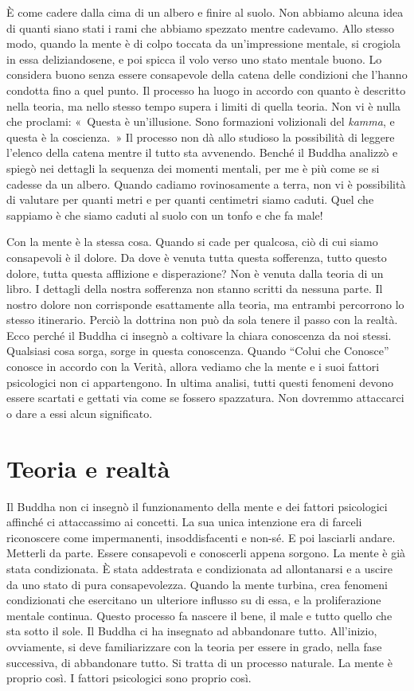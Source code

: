 È come cadere dalla cima di un albero e finire al suolo. Non abbiamo
alcuna idea di quanti siano stati i rami che abbiamo spezzato mentre
cadevamo. Allo stesso modo, quando la mente è di colpo toccata da
un'impressione mentale, si crogiola in essa deliziandosene, e poi spicca
il volo verso uno stato mentale buono. Lo considera buono senza essere
consapevole della catena delle condizioni che l'hanno condotta fino a
quel punto. Il processo ha luogo in accordo con quanto è descritto nella
teoria, ma nello stesso tempo supera i limiti di quella teoria. Non vi è
nulla che proclami: «~Questa è un'illusione. Sono formazioni volizionali
del \emph{kamma}, e questa è la coscienza.~» Il processo non dà allo
studioso la possibilità di leggere l'elenco della catena mentre il tutto
sta avvenendo. Benché il Buddha analizzò e spiegò nei dettagli la
sequenza dei momenti mentali, per me è più come se si cadesse da un
albero. Quando cadiamo rovinosamente a terra, non vi è possibilità di
valutare per quanti metri e per quanti centimetri siamo caduti. Quel che
sappiamo è che siamo caduti al suolo con un tonfo e che fa male!

Con la mente è la stessa cosa. Quando si cade per qualcosa, ciò di cui
siamo consapevoli è il dolore. Da dove è venuta tutta questa sofferenza,
tutto questo dolore, tutta questa afflizione e disperazione? Non è
venuta dalla teoria di un libro. I dettagli della nostra sofferenza non
stanno scritti da nessuna parte. Il nostro dolore non corrisponde
esattamente alla teoria, ma entrambi percorrono lo stesso itinerario.
Perciò la dottrina non può da sola tenere il passo con la realtà. Ecco
perché il Buddha ci insegnò a coltivare la chiara conoscenza da noi
stessi. Qualsiasi cosa sorga, sorge in questa conoscenza. Quando ``Colui
che Conosce'' conosce in accordo con la Verità, allora vediamo che la
mente e i suoi fattori psicologici non ci appartengono. In ultima
analisi, tutti questi fenomeni devono essere scartati e gettati via come
se fossero spazzatura. Non dovremmo attaccarci o dare a essi alcun
significato.

\section{Teoria e realtà}

Il Buddha non ci insegnò il funzionamento della mente e dei fattori
psicologici affinché ci attaccassimo ai concetti. La sua unica
intenzione era di farceli riconoscere come impermanenti, insoddisfacenti
e non-sé. E poi lasciarli andare. Metterli da parte. Essere consapevoli
e conoscerli appena sorgono. La mente è già stata condizionata. È stata
addestrata e condizionata ad allontanarsi e a uscire da uno stato di
pura consapevolezza. Quando la mente turbina, crea fenomeni condizionati
che esercitano un ulteriore influsso su di essa, e la proliferazione
mentale continua. Questo processo fa nascere il bene, il male e tutto
quello che sta sotto il sole. Il Buddha ci ha insegnato ad abbandonare
tutto. All'inizio, ovviamente, si deve familiarizzare con la teoria per
essere in grado, nella fase successiva, di abbandonare tutto. Si tratta
di un processo naturale. La mente è proprio così. I fattori psicologici
sono proprio così.

